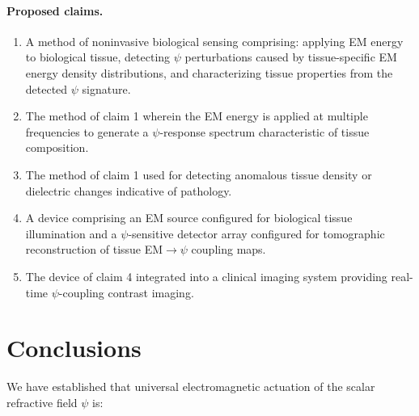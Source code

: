 \documentclass[aps,prd,twocolumn,superscriptaddress,floatfix,nofootinbib]{revtex4-2}
\begin{document}
\paragraph{Proposed claims.}
\begin{enumerate}[nosep]
\item A method of noninvasive biological sensing comprising:
applying EM energy to biological tissue, detecting $\psi$
perturbations caused by tissue-specific EM energy density
distributions, and characterizing tissue properties from the
detected $\psi$ signature.
\item The method of claim 1 wherein the EM energy is applied at
multiple frequencies to generate a $\psi$-response spectrum
characteristic of tissue composition.
\item The method of claim 1 used for detecting anomalous tissue
density or dielectric changes indicative of pathology.
\item A device comprising an EM source configured for biological
tissue illumination and a $\psi$-sensitive detector array configured
for tomographic reconstruction of tissue EM$\to\psi$ coupling
maps.
\item The device of claim 4 integrated into a clinical imaging
system providing real-time $\psi$-coupling contrast imaging.
\end{enumerate}

\section{Conclusions}\label{sec:conclusions}

We have established that universal electromagnetic actuation of the
scalar refractive field $\psi$ is:
\end{document}
